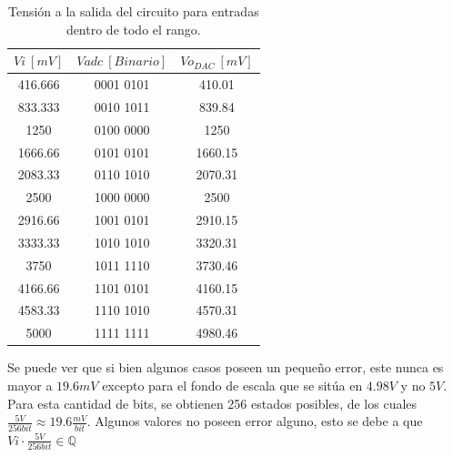 \begin{table}[H]
\centering
\begin{tabular}{ccc}
\toprule
$Vi \ [mV]$ & $Vadc \ [Binario]$ & $Vo_{DAC} \ [mV]$ \\ \midrule
416.666 & 0001 0101 & 410.01 \\
833.333 & 0010 1011 & 839.84 \\
1250 & 0100 0000 & 1250 \\
1666.66 & 0101 0101 & 1660.15 \\
2083.33 & 0110 1010 & 2070.31 \\
2500 & 1000 0000 & 2500 \\
2916.66 & 1001 0101 & 2910.15 \\
3333.33 & 1010 1010 & 3320.31 \\
3750 & 1011 1110 & 3730.46 \\
4166.66 & 1101 0101 & 4160.15 \\
4583.33 & 1110 1010 & 4570.31 \\
5000 & 1111 1111 & 4980.46 \\ \bottomrule
\end{tabular}
\caption{Tensión a la salida del circuito para entradas dentro de todo el rango.}
\end{table}

Se puede ver que si bien algunos casos poseen un pequeño error, este nunca es mayor a $19.6mV$ excepto para el fondo de escala que se sitúa en $4.98V$ y no $5V$. Para esta cantidad de bits, se obtienen 256 estados posibles, de los cuales $\frac{5V}{256bit} \approx 19.6\frac{mV}{bit}$. Algunos valores no poseen error alguno, esto se debe a que $Vi\cdot \frac{5V}{256bit} \in \mathbb{Q}$

